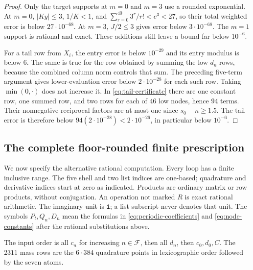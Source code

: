 \begin{proof}
Only the target supports at $m=0$ and $m=3$ use a rounded exponential.
At $m=0$, $|Ky|\le3$, $1/K<1$, and
$\sum_{r=0}^{40}3^r/r!<e^3<27$, so their total weighted error is below
$27\cdot10^{-68}$.  At $m=3$, $J/2\le3$ gives error below
$3\cdot10^{-68}$.  The $m=1$ support is rational and exact.  These
additions still leave a bound far below $10^{-6}$.

For a tail row from $X_i$, the entry error is below $10^{-29}$ and its
entry modulus is below $6$.  The same is true for the row obtained by
summing the low $d_n$ rows, because the combined column norm controls that
sum.  The preceding five-term argument gives lower-evaluation error below
$2\cdot10^{-28}$ for each such row.  Taking $\min(0,\cdot)$ does not
increase it.  In \eqref{eq:tail-certificate} there are one constant row,
one summed row, and two rows for each of $46$ low nodes, hence $94$ terms.
Their nonnegative reciprocal factors are at most one since $s_0-n\ge1.5$.
The tail error is therefore below $94(2\cdot10^{-28})<2\cdot10^{-26}$,
in particular below $10^{-6}$.
\end{proof}

\subsection{The complete floor-rounded finite prescription}

We now specify the alternative rational computation.  Every loop has a
finite inclusive range.  The five shell and two list indices are one-based;
quadrature and derivative indices start at zero as indicated.  Products
are ordinary matrix or row products, without conjugation.  An operation
not marked $R$ is exact rational arithmetic.  The imaginary unit is
\texttt{i}; a list subscript never denotes that unit.  The symbols
$P_l,Q_n,D_n$ mean the formulas in \eqref{eq:periodic-coefficients} and
\eqref{eq:node-constants} after the rational substitutions above.

The input order is all $c_n$ for increasing $n\in\mathcal F$, then all
$d_n$, then $c_0,d_0,C$.  The $2311$ mass rows are the $6\cdot384$
quadrature points in lexicographic order followed by the seven atoms.

